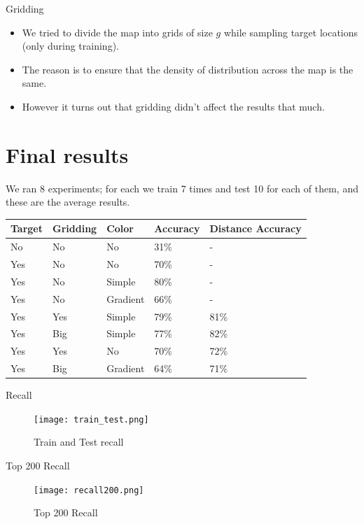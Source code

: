 \documentclass{beamer}
\begin{document}
\begin{frame}{Gridding}
\begin{itemize}
    \item We tried to divide the map into grids of size $g$ while sampling target locations (only during training).
    \item The reason is to ensure that the density of distribution across the map is the same.
    \item However it turns out that gridding didn't affect the results that much.
\end{itemize}
\end{frame}

\section{Final results}
\begin{frame}
We ran 8 experiments; for each we train 7 times and test 10 for each of them, and these are the average results.
\begin{center}
    \begin{tabular}{| l | l | l | l | l |}
    \hline
    Target & Gridding & Color & Accuracy & Distance Accuracy \\ \hline
    No & No & No & 31\% & - \\ \hline
    Yes & No & No & 70\% & - \\ \hline
    Yes & No & Simple & 80\% & - \\ \hline
    Yes & No & Gradient & 66\% & - \\ \hline
    Yes & Yes & Simple & 79\% & 81\% \\ \hline
    Yes & Big& Simple & 77\% & 82\% \\ \hline
    Yes & Yes & No & 70\% & 72\% \\ \hline
    Yes & Big & Gradient & 64\% & 71\% \\ \hline
    \end{tabular}
\end{center}
\end{frame}

\iffalse
\begin{frame}{Recall}
\begin{figure}
        \texttt{[image: train\_test.png]}
        \caption{Train and Test recall}
    \label{fig1}
\end{figure}
\end{frame}

\begin{frame}{Top 200 Recall}
\begin{figure}
        \texttt{[image: recall200.png]}
        \caption{Top 200 Recall}
    \label{fig1}
\end{figure}
\end{frame}
\end{document}
